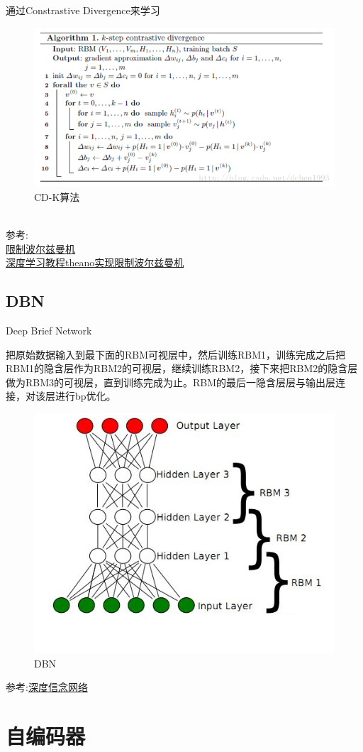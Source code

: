 \documentclass{article}
\begin{document}
通过Constrastive Divergence来学习\\
\begin{figure}[h]
\centering
\includegraphics[width=0.8\linewidth]{3.png}
\caption{CD-K算法}
\end{figure}\\
参考:\\
\href{http://lib.csdn.net/article/deeplearning/59097?knId=1746}{限制波尔兹曼机}\\
\href{http://deeplearning.net/tutorial/rbm.html#rbm}{深度学习教程theano实现限制波尔兹曼机}
\subsection{DBN}
Deep Brief Network

把原始数据输入到最下面的RBM可视层中，然后训练RBM1，训练完成之后把RBM1的隐含层作为RBM2的可视层，继续训练RBM2，接下来把RBM2的隐含层做为RBM3的可视层，直到训练完成为止。RBM的最后一隐含层层与输出层连接，对该层进行bp优化。
\begin{figure}[h]
\centering
\includegraphics[height=0.5\linewidth]{2.png}
\caption{DBN}
\end{figure}
参考:\href{}{深度信念网络}



\section{自编码器}
\end{document}

